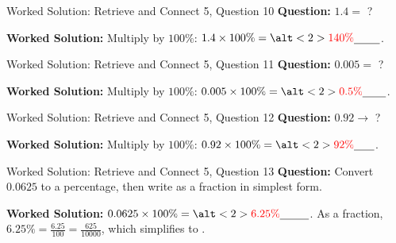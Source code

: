 \documentclass{beamer}
\newcommand{\ablank}[1]{%
  \alt<2>{\textcolor{red}{#1}}{\underline{\phantom{#1}}}%
}
\begin{document}
\begin{frame}[t]{Worked Solution: Retrieve and Connect 5, Question 10}
\textbf{Question:} \(1.4 =\) ?

\smallskip
\textbf{Worked Solution:} Multiply by \(100\%\): \(1.4 \times 100\% = \ablank{140\%}\).
\end{frame}

\begin{frame}[t]{Worked Solution: Retrieve and Connect 5, Question 11}
\textbf{Question:} \(0.005 =\) ?

\smallskip
\textbf{Worked Solution:} Multiply by \(100\%\): \(0.005 \times 100\% = \ablank{0.5\%}\).
\end{frame}

\begin{frame}[t]{Worked Solution: Retrieve and Connect 5, Question 12}
\textbf{Question:} \(0.92 \to\) ?

\smallskip
\textbf{Worked Solution:} Multiply by \(100\%\): \(0.92 \times 100\% = \ablank{92\%}\).
\end{frame}

\begin{frame}[t]{Worked Solution: Retrieve and Connect 5, Question 13}
\textbf{Question:} Convert \(0.0625\) to a percentage, then write as a fraction in simplest form.

\smallskip
\textbf{Worked Solution:} \(0.0625 \times 100\% = \ablank{6.25\%}\). As a fraction, \(6.25\% = \frac{6.25}{100} = \frac{625}{10000}\), which simplifies to \ablank{$\frac{1}{16}$}.
\end{frame}
\end{document}
